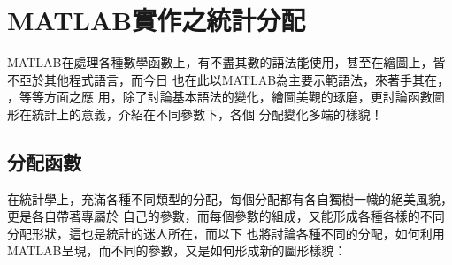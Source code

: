 %
%
\chapter{ \MJH MATLAB實作之統計分配}
	MATLAB在處理各種數學函數上，有不盡其數的語法能使用，甚至在繪圖上，皆不亞於其他程式語言，而今日		也在此以MATLAB為主要示範語法，來著手其在\textbf{\color{darkblue}{函數展現}}，					\textbf{\color{darkblue}{繪圖討論}}，\textbf{\color{darkblue}{亂數產生}}等等方面之應			用，除了討論基本語法的變化，繪圖美觀的琢磨，更討論函數圖形在統計上的意義，介紹在不同參數下，各個		分配變化多端的樣貌！\\
	\bigskip
	\section{分配函數}
		在統計學上，充滿各種不同類型的分配，每個分配都有各自獨樹一幟的絕美風貌，更是各自帶著專屬於			自己的參數，而每個參數的組成，又能形成各種各樣的不同分配形狀，這也是統計的迷人所在，而以下			也將討論各種不同的分配，如何利用MATLAB呈現，而不同的參數，又是如何形成新的圖形樣貌：
